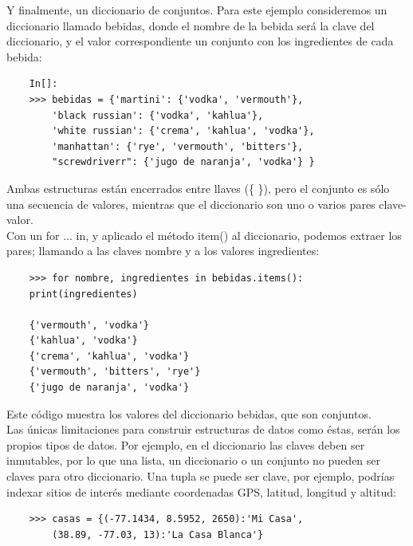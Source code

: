 Y finalmente,  un diccionario de conjuntos. Para este ejemplo consideremos un diccionario llamado bebidas, donde  el nombre de la bebida será la clave del diccionario, y el valor correspondiente un conjunto con los ingredientes de cada bebida:

\begin{lstlisting}
	In[]:
	>>> bebidas = {'martini': {'vodka', 'vermouth'},
		'black russian': {'vodka', 'kahlua'},
		'white russian': {'crema', 'kahlua', 'vodka'},
		'manhattan': {'rye', 'vermouth', 'bitters'},
		"screwdriverr": {'jugo de naranja', 'vodka'} }
\end{lstlisting}

Ambas estructuras están encerrados entre llaves (\{  \}), pero el conjunto es sólo una secuencia de valores,
mientras que el diccionario son uno o varios pares clave-valor.\\

Con un {\ttfamily for ... in}, y aplicado el método {\ttfamily item()} al diccionario, podemos extraer los pares; llamando a las claves nombre y a los valores ingredientes:

\begin{lstlisting}
	>>> for nombre, ingredientes in bebidas.items():
	print(ingredientes)
	
	{'vermouth', 'vodka'}
	{'kahlua', 'vodka'}
	{'crema', 'kahlua', 'vodka'}
	{'vermouth', 'bitters', 'rye'}
	{'jugo de naranja', 'vodka'}			
\end{lstlisting}

\noindent Este código muestra los valores del diccionario bebidas, que son conjuntos.\\


Las únicas limitaciones para construir estructuras de datos como éstas, serán los propios tipos de datos. Por ejemplo, en el diccionario las claves deben ser inmutables, por lo que una lista, un diccionario o un conjunto no pueden ser claves para otro diccionario.
Una  tupla se puede ser clave, por ejemplo, podrías indexar sitios de interés mediante coordenadas GPS, latitud, longitud y altitud:

\begin{lstlisting}
	>>> casas = {(-77.1434, 8.5952, 2650):'Mi Casa',
		(38.89, -77.03, 13):'La Casa Blanca'}
\end{lstlisting}

